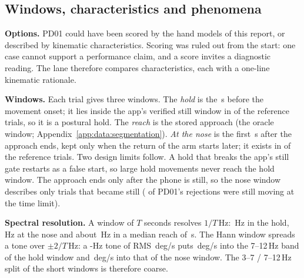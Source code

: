 \subsection{Windows, characteristics and phenomena}\label{app:pd01:characteristics}

\textbf{Options.}
PD01 could have been scored by the hand models of this report, or described by kinematic characteristics.
Scoring was ruled out from the start: one case cannot support a performance claim, and a score invites a diagnostic reading.
The lane therefore compares characteristics, each with a one-line kinematic rationale.

\textbf{Windows.}
Each trial gives three windows.
The \emph{hold} is the \,s before the movement onset; it lies inside the app's verified still window in  of the reference trials, so it is a postural hold.
The \emph{reach} is the stored approach (the oracle window; Appendix~\ref{app:data:segmentation}).
\emph{At the nose} is the first \,s after the approach ends, kept only when the return of the arm starts later; it exists in  of the reference trials.
Two design limits follow.
A hold that breaks the app's still gate restarts as a false start, so large hold movements never reach the hold window.
The approach ends only after the phone is still, so the nose window describes only trials that became still ( of PD01's rejections were still moving at the time limit).

\textbf{Spectral resolution.}
A window of $T$ seconds resolves $1/T$\,Hz: \,Hz in the hold, \,Hz at the nose and about \,Hz in a median reach of \,s.
The Hann window spreads a tone over $\pm 2/T$\,Hz: a -Hz tone of RMS \,deg/s puts \,deg/s into the 7--12\,Hz band of the hold window and \,deg/s into that of the nose window.
The 3--7 / 7--12\,Hz split of the short windows is therefore coarse.

